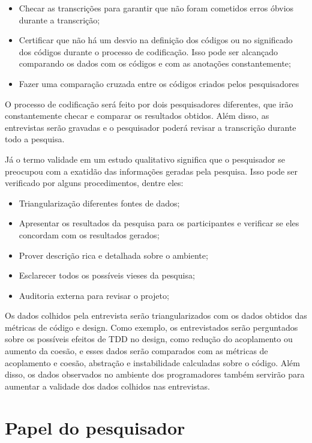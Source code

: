 \begin{itemize}
	\item Checar as transcrições para garantir que não foram cometidos erros óbvios durante a transcrição;
	\item Certificar que não há um desvio na definição dos códigos ou no significado dos códigos durante o processo de codificação. Isso pode ser alcançado comparando os dados com os códigos e com as anotações constantemente;
	\item Fazer uma comparação cruzada entre os códigos criados pelos pesquisadores
\end{itemize}

O processo de codificação será feito por dois pesquisadores diferentes, que irão constantemente checar e comparar os resultados
obtidos. Além disso, as entrevistas serão gravadas e o pesquisador poderá revisar a transcrição durante todo a pesquisa.

Já o termo validade em um estudo qualitativo significa que o pesquisador se preocupou com a exatidão das informações
geradas pela pesquisa. Isso pode ser verificado por alguns procedimentos, dentre eles:

\begin{itemize}
	\item Triangularização diferentes fontes de dados;
	\item Apresentar os resultados da pesquisa para os participantes e verificar se eles concordam com os resultados gerados;
	\item Prover descrição rica e detalhada sobre o ambiente;
	\item Esclarecer todos os possíveis vieses da pesquisa;
	\item Auditoria externa para revisar o projeto;
\end{itemize}

Os dados colhidos pela entrevista serão triangularizados com os dados obtidos das métricas de código e design. 
Como exemplo, os entrevistados serão perguntados sobre os possíveis efeitos de TDD no design, como redução do acoplamento ou
aumento da coesão, e esses dados serão comparados com as métricas de acoplamento e coesão, abstração e instabilidade 
calculadas sobre o código.
Além disso, os dados observados no ambiente dos programadores também servirão para aumentar a validade dos 
dados colhidos nas entrevistas.

\section{Papel do pesquisador}
\label{sec:planejamento-papel}


